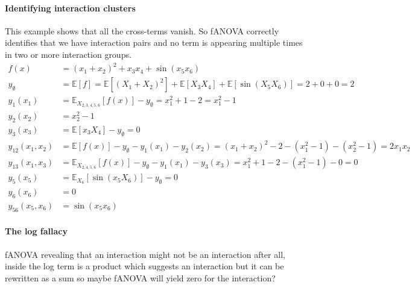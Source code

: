 \paragraph{Identifying interaction clusters}
This example shows that all the cross-terms vanish. So fANOVA correctly identifies that we have interaction pairs and no term is appearing multiple times in two or more interaction groups.
\begin{align*}
f(x) &= (x_1 + x_2)^2 + x_3 x_4 + \sin(x_5 x_6) \\[1em]
y_\emptyset &= \mathbb{E}[f] = \mathbb{E}[(X_1 + X_2)^2] + \mathbb{E}[X_3 X_4] + \mathbb{E}[\sin(X_5 X_6)] = 2 + 0 + 0 = 2 \\[1em]
y_1(x_1) &= \mathbb{E}_{X_{2,3,4,5,6}}[f(x)] - y_\emptyset = x_1^2 + 1 - 2 = x_1^2 - 1 \\
y_2(x_2) &= x_2^2 - 1 \\
y_3(x_3) &= \mathbb{E}[x_3 X_4] - y_\emptyset = 0 \\
y_{12}(x_1, x_2) &= \mathbb{E}[f(x)] - y_\emptyset - y_1(x_1) - y_2(x_2) = (x_1 + x_2)^2 - 2 - (x_1^2 - 1) - (x_2^2 - 1) = 2x_1 x_2 \\
y_{13}(x_1, x_3) &= \mathbb{E}_{X_{2,4,5,6}}[f(x)] - y_\emptyset - y_1(x_1) - y_3(x_3) = x_1^2 + 1 - 2 - (x_1^2 - 1) - 0 = 0 \\
y_5(x_5) &= \mathbb{E}_{X_6}[\sin(x_5 X_6)] - y_\emptyset = 0 \\
y_6(x_6) &= 0 \\
y_{56}(x_5, x_6) &= \sin(x_5 x_6)
\end{align*}

\paragraph{The log fallacy}
fANOVA revealing that an interaction might not be an interaction after all, inside the log term is a product which suggests an interaction but it can be rewritten as a sum so maybe fANOVA will yield zero for the interaction?
